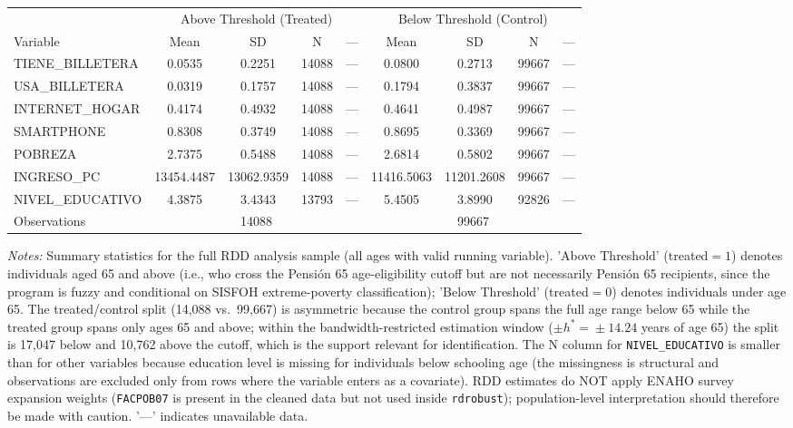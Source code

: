 \begin{threeparttable}
\begin{tabular}{l cccc cccc}
\toprule
& \multicolumn{4}{c}{Above Threshold (Treated)} & \multicolumn{4}{c}{Below Threshold (Control)} \\
\cmidrule(lr){2-5} \cmidrule(lr){6-9}
Variable & Mean & SD & N & --- & Mean & SD & N & --- \\
\midrule
  TIENE\_BILLETERA & 0.0535 & 0.2251 & 14088 & --- & 0.0800 & 0.2713 & 99667 & --- \\
  USA\_BILLETERA & 0.0319 & 0.1757 & 14088 & --- & 0.1794 & 0.3837 & 99667 & --- \\
  INTERNET\_HOGAR & 0.4174 & 0.4932 & 14088 & --- & 0.4641 & 0.4987 & 99667 & --- \\
  SMARTPHONE & 0.8308 & 0.3749 & 14088 & --- & 0.8695 & 0.3369 & 99667 & --- \\
  POBREZA & 2.7375 & 0.5488 & 14088 & --- & 2.6814 & 0.5802 & 99667 & --- \\
  INGRESO\_PC & 13454.4487 & 13062.9359 & 14088 & --- & 11416.5063 & 11201.2608 & 99667 & --- \\
  NIVEL\_EDUCATIVO & 4.3875 & 3.4343 & 13793 & --- & 5.4505 & 3.8990 & 92826 & --- \\
\midrule
  Observations & \multicolumn{4}{c}{14088} & \multicolumn{4}{c}{99667} \\
\bottomrule
\end{tabular}
\begin{tablenotes}
\small
\item \textit{Notes:} Summary statistics for the full RDD analysis sample (all ages with valid running variable). 'Above Threshold' (treated$=1$) denotes individuals aged 65 and above (i.e., who cross the Pensi\'on 65 age-eligibility cutoff but are not necessarily Pensi\'on 65 recipients, since the program is fuzzy and conditional on SISFOH extreme-poverty classification); 'Below Threshold' (treated$=0$) denotes individuals under age 65. The treated/control split (14{,}088 vs.\ 99{,}667) is asymmetric because the control group spans the full age range below 65 while the treated group spans only ages 65 and above; within the bandwidth-restricted estimation window ($\pm h^{\ast}\!=\!\pm 14.24$ years of age 65) the split is 17{,}047 below and 10{,}762 above the cutoff, which is the support relevant for identification. The N column for \texttt{NIVEL\_EDUCATIVO} is smaller than for other variables because education level is missing for individuals below schooling age (the missingness is structural and observations are excluded only from rows where the variable enters as a covariate). RDD estimates do NOT apply ENAHO survey expansion weights (\texttt{FACPOB07} is present in the cleaned data but not used inside \texttt{rdrobust}); population-level interpretation should therefore be made with caution. '---' indicates unavailable data.
\end{tablenotes}
\end{threeparttable}
